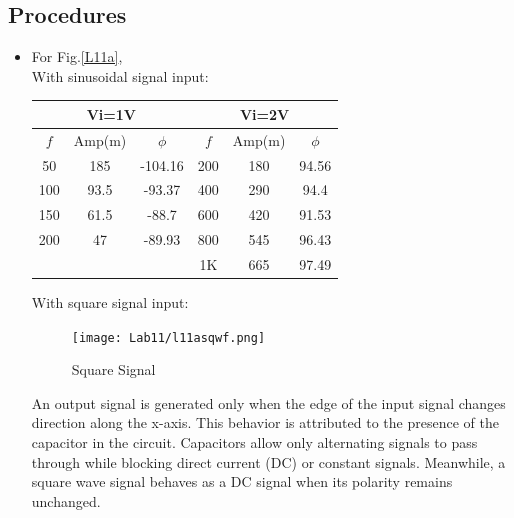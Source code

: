     \subsection{Procedures}
    \begin{itemize}
        \item For Fig.\ref{L11a},\\
        With sinusoidal signal input:\\
\begin{table}[h]
\centering
\begin{tabular}{|ccc|ccc|}
\hline
\multicolumn{3}{|c|}{Vi=1V}                                       & \multicolumn{3}{c|}{Vi=2V}                                      \\ \hline
\multicolumn{1}{|c|}{$f$} & \multicolumn{1}{c|}{Amp(m)} & $\phi$  & \multicolumn{1}{c|}{$f$} & \multicolumn{1}{c|}{Amp(m)} & $\phi$ \\ \hline
\multicolumn{1}{|c|}{50}  & \multicolumn{1}{c|}{185}    & -104.16 & \multicolumn{1}{c|}{200} & \multicolumn{1}{c|}{180}    & 94.56  \\ \hline
\multicolumn{1}{|c|}{100} & \multicolumn{1}{c|}{93.5}   & -93.37  & \multicolumn{1}{c|}{400} & \multicolumn{1}{c|}{290}    & 94.4   \\ \hline
\multicolumn{1}{|c|}{150} & \multicolumn{1}{c|}{61.5}   & -88.7   & \multicolumn{1}{c|}{600} & \multicolumn{1}{c|}{420}    & 91.53  \\ \hline
\multicolumn{1}{|c|}{200} & \multicolumn{1}{c|}{47}     & -89.93  & \multicolumn{1}{c|}{800} & \multicolumn{1}{c|}{545}    & 96.43  \\ \hline
\multicolumn{1}{|c|}{}    & \multicolumn{1}{c|}{}       &         & \multicolumn{1}{c|}{1K}  & \multicolumn{1}{c|}{665}    & 97.49  \\ \hline
\end{tabular}
\end{table}
\FloatBarrier
    With square signal input:\\
    \begin{figure}[h]
        \centering
        \texttt{[image: Lab11/l11asqwf.png]}
        \caption{Square Signal}
        \label{l11asqwf}
    \end{figure}
\FloatBarrier
An output signal is generated only when the edge of the input signal changes direction along the x-axis. This behavior is attributed to the presence of the capacitor in the circuit. Capacitors allow only alternating signals to pass through while blocking direct current (DC) or constant signals. Meanwhile, a square wave signal behaves as a DC signal when its polarity remains unchanged.


\end{itemize}
